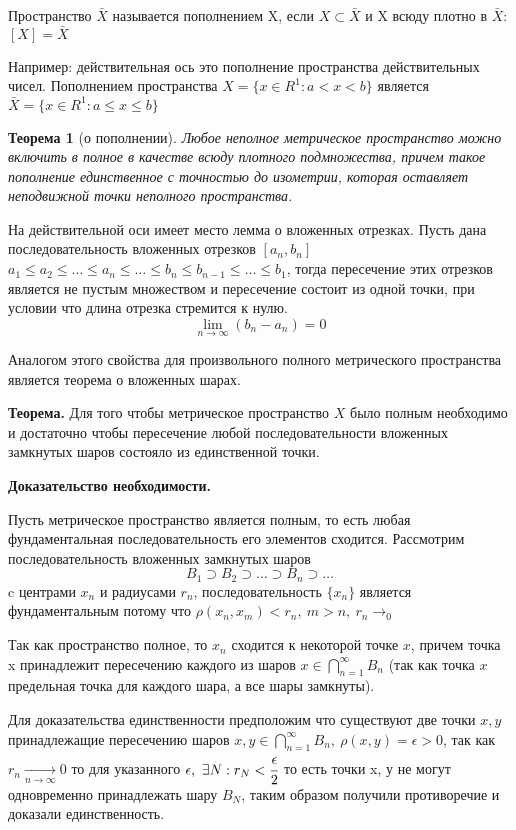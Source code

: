 \documentclass[14pt]{extarticle}
\newtheorem{theorem}{Теорема}[section]
\theoremstyle{definition}
\theoremstyle{remark}
\renewcommand{\[}{\begin{dmath*}[compact]}
\renewcommand{\]}{\end{dmath*}}
\newcommand{\sep}{ , \ \allowbreak }
\newcommand{\tth}[1][]{\textbf{Теорема#1.}}
\begin{document}
Пространство $\bar X$ называется пополнением X, если $X \subset \bar{X}$ и X
всюду плотно в $\bar X$: $[X] = \bar X$

Например: действительная ось это пополнение пространства действительных чисел.
Пополнением пространства $X = \{x \in R^1: a < x < b\}$ является
$\bar{X} = \{x \in R^1: a \leq x \leq b\}$

\begin{theorem}[о пополнении]
\label{th:о пополнении}
Любое неполное метрическое пространство можно
включить в полное в качестве всюду плотного подмножества,
причем такое пополнение единственное с точностью до изометрии,
которая оставляет неподвижной точки неполного пространства.
\end{theorem}

На действительной оси имеет место лемма о вложенных отрезках. Пусть дана
последовательность вложенных отрезков $[a_n, b_n]$ $a_1 \leq a_2 \leq \dots \leq
a_n \leq \dots \leq b_n \leq b_{n-1} \leq \dots \leq b_1 $, тогда пересечение
этих отрезков является не пустым множеством и пересечение состоит из одной
точки, при условии что длина отрезка стремится к нулю.
\[ \lim_{n \to \infty}(b_n - a_n) = 0\]

Аналогом этого свойства для произвольного полного метрического пространства
является теорема о вложенных шарах.

\tth[] Для того чтобы метрическое пространство $X$ было полным
необходимо и достаточно чтобы пересечение любой последовательности вложенных
замкнутых шаров состояло из единственной точки.

\textbf{Доказательство необходимости.}

Пусть метрическое пространство является полным, то есть любая фундаментальная
последовательность его элементов сходится. Рассмотрим последовательность
вложенных замкнутых шаров
\[ {B_{1} \supset B_{2} \supset \dots \supset B_{n} \supset \dots}\]
c центрами $x_{n}$ и радиусами $r_{n}$, последовательность $\{x_n\}$ является
фундаментальным потому что $\rho(x_n, x_m) < r_n\sep m > n\sep r_n\to_0$

Так как пространство полное, то $x_{n}$ сходится к некоторой точке $x$,
причем точка x принадлежит пересечению каждого из шаров
$x \in \bigcap _{n = 1}^{\infty} B_{n}$ (так как точка $x$
предельная точка для каждого шара, а все шары замкнуты).

Для доказательства единственности предположим что существуют две точки $x, y$
принадлежащие пересечению шаров
$x, y \in \bigcap _{n = 1}^{\infty} B_{n} \sep \rho(x, y) = \epsilon > 0$, так как
$r_n \xrightarrow[n \to \infty]{} 0$ то для указанного
$\epsilon \sep \exists N: r_N < \cfrac\epsilon2$
то есть точки x, у не могут одновременно принадлежать шару $B_N$, таким образом
получили противоречие и доказали единственность.
\end{document}
